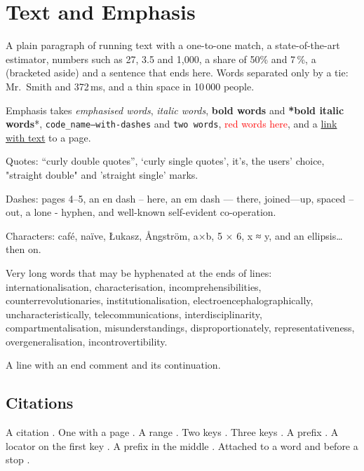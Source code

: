 \section{Text and Emphasis}
\label{sec:text}

A plain paragraph of running text with a one-to-one match, a state-of-the-art estimator, numbers such as 27, 3.5 and 1,000, a share of 50\% and 7\,\%, a (bracketed aside) and a sentence that ends here. Words separated only by a tie: Mr.~Smith and 372\,ms, and a thin space in 10\,000 people.

Emphasis takes \emph{emphasised words}, \textit{italic words}, \textbf{bold words} and \textbf{*bold italic words}*, \texttt{code\_name--with-dashes} and \texttt{two words}, \textcolor{red}{red words here}, and a \href{https://example.org/a-b_c}{link with text} to a page.

Quotes: ``curly double quotes'', `curly single quotes', it's, the users' choice, "straight double" and 'straight single' marks.

Dashes: pages 4--5, an en dash – here, an em dash — there, joined---up, spaced -- out, a lone - hyphen, and well-known self-evident co-operation.

Characters: café, naïve, Łukasz, Ångström, a×b, 5 × 6, x ≈ y, and an ellipsis… then on.

Very long words that may be hyphenated at the ends of lines: internationalisation, characterisation, incomprehensibilities, counterrevolutionaries, institutionalisation, electroencephalographically, uncharacteristically, telecommunications, interdisciplinarity, compartmentalisation, misunderstandings, disproportionately, representativeness, overgeneralisation, incontrovertibility.

A line with an end comment %
and its continuation.

\subsection{Citations}
\label{sec:text:cites}

A citation \cite{one}. One with a page \cite[p.~27]{one}. A range \cite[pp.~4–5]{two}. Two keys \cite{one, two}. Three keys \cite{one, two, three}. A prefix \cite[see][p.~2]{two}. A locator on the first key \cites[p.~3]{one}{two}. A prefix in the middle \cites{one}[see][p.~4]{two}{three}. Attached to a word\cite{one} and before a stop \cite{three}.

